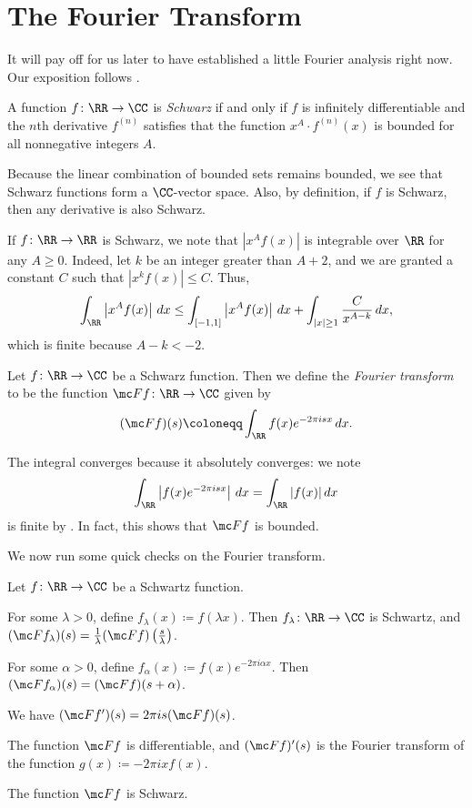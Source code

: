 \documentclass[notes.tex]{subfiles}
\begin{document}
\section{The Fourier Transform}
It will pay off for us later to have established a little Fourier analysis right now. Our exposition follows \cite[Chapter~5]{stein-fourier-analysis}.
\begin{definition}[Schwarz]
	A function $f\colon\RR\to\CC$ is \textit{Schwarz} if and only if $f$ is infinitely differentiable and the $n$th derivative $f^{(n)}$ satisfies that the function $x^A\cdot f^{(n)}(x)$ is bounded for all nonnegative integers $A$.
\end{definition}
\begin{remark} \label{rem:build-schwarz-functions}
	Because the linear combination of bounded sets remains bounded, we see that Schwarz functions form a $\CC$-vector space. Also, by definition, if $f$ is Schwarz, then any derivative is also Schwarz.
\end{remark}
\begin{remark} \label{rem:integrate-schwarz}
	If $f\colon\RR\to\RR$ is Schwarz, we note that $\left|x^Af(x)\right|$ is integrable over $\RR$ for any $A\ge0$. Indeed, let $k$ be an integer greater than $A+2$, and we are granted a constant $C$ such that $\left|x^kf(x)\right|\le C$. Thus,
	\[\int_\RR\left|x^Af(x)\right|\,dx\le\int_{[-1,1]}\left|x^Af(x)\right|\,dx+\int_{|x|\ge1}\frac C{x^{A-k}}\,dx,\]
	which is finite because $A-k<-2$.
\end{remark}
\begin{definition}
	Let $f\colon\RR\to\CC$ be a Schwarz function. Then we define the \textit{Fourier transform} to be the function $\mc Ff\colon\RR\to\CC$ given by
	\[(\mc Ff)(s)\coloneqq\int_\RR f(x)e^{-2\pi isx}\,dx.\]
\end{definition}
\begin{remark} \label{rem:fourier-transform-converges}
	The integral converges because it absolutely converges: we note
	\[\int_\RR\left|f(x)e^{-2\pi isx}\right|\,dx=\int_\RR|f(x)|\,dx\]
	is finite by . In fact, this shows that $\mc Ff$ is bounded.
\end{remark}
We now run some quick checks on the Fourier transform.
\begin{lemma} \label{lem:fourier-checks}
	Let $f\colon\RR\to\CC$ be a Schwartz function.
	\begin{listalph}
		\item For some $\lambda>0$, define $f_\lambda(x)\coloneqq f(\lambda x)$. Then $f_\lambda\colon\RR\to\CC$ is Schwartz, and $(\mc Ff_\lambda)(s)=\frac1\lambda(\mc Ff)\left(\frac s\lambda\right)$.
		\item For some $\alpha>0$, define $f_\alpha(x)\coloneqq f(x)e^{-2\pi i\alpha x}$. Then $(\mc Ff_\alpha)(s)=(\mc Ff)(s+\alpha)$.
		\item We have $(\mc Ff')(s)=2\pi is(\mc Ff)(s)$.
		\item The function $\mc Ff$ is differentiable, and $(\mc Ff)'(s)$ is the Fourier transform of the function $g(x)\coloneqq-2\pi ixf(x)$.
		\item The function $\mc Ff$ is Schwarz.
	\end{listalph}
\end{lemma}
\end{document}
